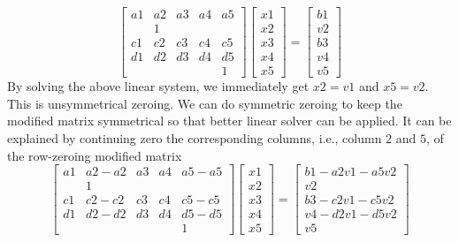 \documentclass{report}
\begin{document}
$$
\left[ \begin{array}{lllll}
         a1 & a2 & a3 & a4 & a5 \\
            &  1 &    &    &    \\
         c1 & c2 & c3 & c4 & c5 \\
         d1 & d2 & d3 & d4 & d5 \\
            &    &    &    &  1
\end{array} \right]
\left[ \begin{array}{l}
         x1\\
         x2\\
         x3\\
         x4\\
         x5
\end{array} \right]
=
\left[ \begin{array}{l}
         b1\\
         v2\\
         b3\\
         v4\\
         v5
\end{array} \right]
$$
By solving the above linear system, we immediately get $x2=v1$ and $x5=v2$.
This is unsymmetrical zeroing.
We can do symmetric zeroing to keep the modified matrix symmetrical
so that better linear solver can be applied. It can be explained 
by continuing zero the corresponding columns, i.e., column $2$ and $5$,
of the row-zeroing modified matrix
$$
\left[ \begin{array}{lllll}
         a1 & a2-a2 & a3 & a4 & a5-a5 \\
            &  1    &    &    &       \\
         c1 & c2-c2 & c3 & c4 & c5-c5 \\
         d1 & d2-d2 & d3 & d4 & d5-d5 \\
            &       &    &    &  1
\end{array} \right]
\left[ \begin{array}{l}
         x1\\
         x2\\
         x3\\
         x4\\
         x5
\end{array} \right]
=
\left[ \begin{array}{l}
         b1-a2v1-a5v2\\
         v2\\
         b3-c2v1-c5v2\\
         v4-d2v1-d5v2\\
         v5
\end{array} \right]
$$
\end{document}
